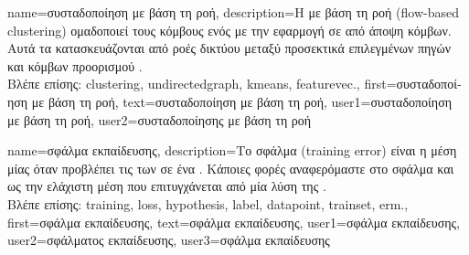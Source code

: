 {name={\foreignlanguage{greek}{συσταδοποίηση με βάση τη ροή}},
	description={\foreignlanguage{greek}{Η}  
		\foreignlanguage{greek}{με βάση τη ροή} (flow-based clustering) \foreignlanguage{greek}{ομαδοποιεί τους κόμβους ενός}  
		 \foreignlanguage{greek}{με την εφαρμογή}   
		\foreignlanguage{greek}{σε}  \foreignlanguage{greek}{από άποψη κόμβων. Αυτά τα}  
		\foreignlanguage{greek}{κατασκευάζονται από ροές δικτύου μεταξύ προσεκτικά επιλεγμένων πηγών και κόμβων προορισμού} 
		\cite{FlowSpecClustering2021}.
		\\
		\foreignlanguage{greek}{Βλέπε επίσης:} \gls{clustering}, \gls{undirectedgraph}, \gls{kmeans}, \gls{featurevec}.}, 
	first={\foreignlanguage{greek}{συσταδοποίηση με βάση τη ροή}},
	text={\foreignlanguage{greek}{συσταδοποίηση με βάση τη ροή}},
	user1={\foreignlanguage{greek}{συσταδοποίηση με βάση τη ροή}}, %
    	user2={\foreignlanguage{greek}{συσταδοποίησης με βάση τη ροή}} %
}

{name={\foreignlanguage{greek}{σφάλμα εκπαίδευσης}},
	description={\foreignlanguage{greek}{Το σφάλμα}  (training error) 
		\foreignlanguage{greek}{είναι η μέση}  \foreignlanguage{greek}{μίας} 
		 \foreignlanguage{greek}{όταν προβλέπει τις}  \foreignlanguage{greek}{των} 
		 \foreignlanguage{greek}{σε ένα} . 
		\foreignlanguage{greek}{Κάποιες φορές αναφερόμαστε στο σφάλμα}  \foreignlanguage{greek}{και ως την ελάχιστη 
		μέση}  \foreignlanguage{greek}{που επιτυγχάνεται από μία λύση της} .
		\\
		\foreignlanguage{greek}{Βλέπε επίσης:} \gls{training}, \gls{loss}, \gls{hypothesis}, \gls{label}, \gls{datapoint}, \gls{trainset}, \gls{erm}.},
	first={\foreignlanguage{greek}{σφάλμα εκπαίδευσης}},
	text={\foreignlanguage{greek}{σφάλμα εκπαίδευσης}},
	user1={\foreignlanguage{greek}{σφάλμα εκπαίδευσης}}, %
  	user2={\foreignlanguage{greek}{σφάλματος εκπαί\-δευσης}}, %
	user3={\foreignlanguage{greek}{σφάλμα εκπαί\-δευσης}} %
}

